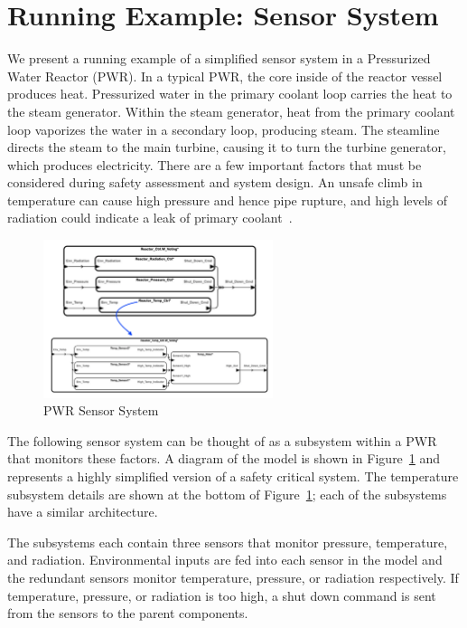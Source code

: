 \section{Running Example: Sensor System}
\label{sec:sensorExample}
We present a running example of a simplified sensor system in a Pressurized Water Reactor (PWR). In a typical PWR, the core inside of the reactor vessel produces heat. Pressurized water in the primary coolant loop carries the heat to the steam generator. Within the steam generator, heat from the primary coolant loop vaporizes the water in a secondary loop, producing steam. The steamline directs the steam to the main turbine, causing it to turn the turbine generator, which produces electricity. There are a few important factors that must be considered during safety assessment and system design. An unsafe climb in temperature can cause high pressure and hence pipe rupture, and high levels of radiation could indicate a leak of primary coolant~\cite{PWR}. 

\begin{figure}[h!]
	\begin{center}
		\includegraphics[width=0.6\textwidth]{images/sensorSysAADL.png}
	\end{center}
	\vspace{-2em}
	\caption{PWR Sensor System}
	\label{fig:sensorSys1}
\end{figure}

The following sensor system can be thought of as a subsystem within a PWR that monitors these factors. A diagram of the model is shown in Figure~\ref{fig:sensorSys1} and represents a highly simplified version of a safety critical system. The temperature subsystem details are shown at the bottom of Figure~\ref{fig:sensorSys1}; each of the subsystems have a similar architecture.

The subsystems each contain three sensors that monitor pressure, temperature, and radiation. Environmental inputs are fed into each sensor in the model and the redundant sensors monitor temperature, pressure, or radiation respectively. If temperature, pressure, or radiation is too high, a shut down command is sent from the sensors to the parent components. 

